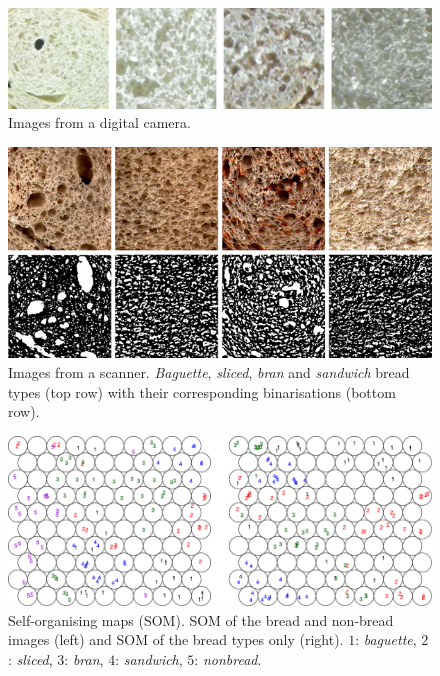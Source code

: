 \documentclass[spanish,a4paper,openright,11pt]{book}
\begin{document}
\begin{figure}[h!]
\centering
\includegraphics{pancamara}
\caption{Images from a digital camera.}
\label{fig:camera}
\end{figure}

\begin{figure}[h!]
\centering
\includegraphics{binarizaciones}
\caption{Images from a scanner. {\em Baguette}, {\em sliced}, {\em bran} and {\em sandwich} bread types (top row) with their corresponding binarisations (bottom row).}
\label{fig:bread}
\end{figure}

\begin{figure}[h!]
\begin{centering}
\includegraphics{SOM}
\caption{Self-organising maps (SOM). SOM of the bread and non-bread images (left) and SOM of the bread types only (right). $1$: {\em baguette}, $2$: {\em sliced}, $3$: {\em bran}, $4$: {\em sandwich}, $5$: {\em nonbread}.}
\label{fig:somfractal}
\end{centering}
\end{figure}
\end{document}
